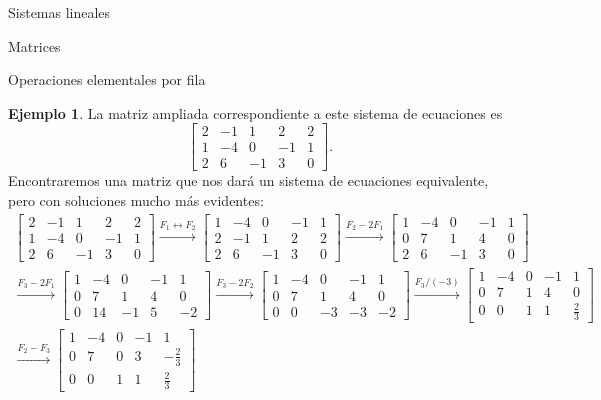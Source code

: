 \documentclass[a4paper,12pt,twoside,spanish,reqno]{amsbook}
\theoremstyle{definition}
\newtheorem{ejemplo}{Ejemplo}[section]
\theoremstyle{remark}
\begin{document}
\begin{chapter}{Sistemas lineales}
\begin{section}{Matrices}
\begin{subsection}{Operaciones elementales por fila}
\begin{ejemplo}
					
					La matriz ampliada  correspondiente a este sistema de ecuaciones es 
					$$
					\left[\begin{array}{cccc|c} 
					 2& -1&1& 2&2 \\ 1&-4 &0&-1&1 \\ 2&6&-1&3&0 \end{array}\right].
					$$
					Encontraremos una matriz que nos dará un sistema de ecuaciones equivalente, pero con soluciones mucho más evidentes:
					\begin{multline*}
					\left[\begin{array}{cccc|c}  2& -1&1& 2&2 \\ 1&-4 &0&-1&1 \\ 2&6&-1&3&0 \end{array}\right]
					\stackrel{F_1\leftrightarrow F_2}{\longrightarrow} 
					\left[\begin{array}{cccc|c}  1&-4 &0&-1&1 \\ 2& -1&1& 2&2 \\ 2&6&-1&3&0 \end{array}\right]
					\stackrel{F_2-2 F_1}{\longrightarrow} 
					\left[\begin{array}{cccc|c}  1&-4 &0&-1&1 \\ 0& 7&1& 4&0 \\ 2&6&-1&3&0 \end{array}\right]
					\\
					\stackrel{F_3-2 F_1}{\longrightarrow} 
					\left[\begin{array}{cccc|c}  1&-4 &0&-1&1 \\ 0& 7&1& 4&0 \\ 0&14&-1&5&-2 \end{array}\right] 
					\stackrel{F_3-2 F_2}{\longrightarrow} 
					\left[\begin{array}{cccc|c}  1&-4 &0&-1&1 \\ 0& 7&1& 4&0 \\ 0&0&-3&-3&-2 \end{array}\right] 
					\stackrel{F_3/(-3)}{\longrightarrow} 
					\left[\begin{array}{cccc|c}  1&-4 &0&-1&1 \\ 0& 7&1& 4&0 \\ 0&0&1&1&\frac{2}{3} \end{array}\right]
					\\
					\stackrel{F_2- F_3}{\longrightarrow} 
					\left[\begin{array}{cccc|c}  1&-4 &0&-1&1 \\ 0& 7&0& 3&-\frac{2}{3} \\ 0&0&1&1&\frac{2}{3} \end{array}\right]

\end{multline*}
\end{ejemplo}
\end{subsection}
\end{section}
\end{chapter}
\end{document}
